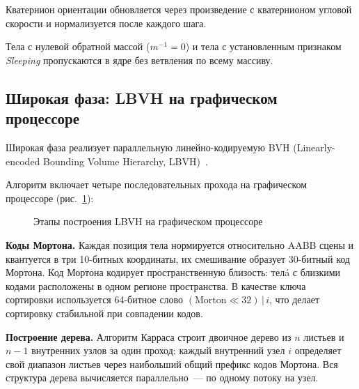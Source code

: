 Кватернион ориентации обновляется через произведение с кватернионом угловой скорости и нормализуется после 
каждого шага.

Тела с нулевой обратной массой ($m^{-1} = 0$) и тела с установленным признаком \textit{Sleeping} пропускаются 
в ядре без ветвления по всему массиву.

\subsection{Широкая фаза: LBVH на графическом процессоре}
\label{sec:broadphase}

Широкая фаза реализует параллельную линейно-кодируемую BVH (Linearly-encoded Bounding Volume Hierarchy, 
LBVH)~\cite{karras2012lbvh}.

Алгоритм включает четыре последовательных прохода на графическом процессоре (рис.~\ref{fig:lbvh_pipeline}):

\begin{figure}[h]
\centering
{}
\caption{Этапы построения LBVH на графическом процессоре}
\label{fig:lbvh_pipeline}
\end{figure}

\textbf{Коды Мортона.} Каждая позиция тела нормируется относительно AABB сцены и квантуется в три 10-битных 
координаты, их смешивание образует 30-битный код Мортона. Код Мортона кодирует пространственную близость: телá 
с близкими кодами расположены в одном регионе пространства. В качестве ключа сортировки используется 64-битное 
слово $(\text{Morton} \ll 32) \,|\, i$, что делает сортировку стабильной при совпадении кодов.

\textbf{Построение дерева.} Алгоритм Карраса строит двоичное дерево из $n$ листьев и $n-1$ внутренних узлов за 
один проход: каждый внутренний узел $i$ определяет свой диапазон листьев через наибольший общий префикс кодов 
Мортона. Вся структура дерева вычисляется параллельно~--- по одному потоку на узел.

